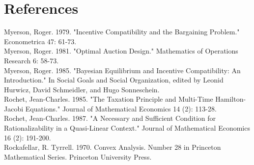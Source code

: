 \documentclass[10pt]{article}
\begin{document}
\section*{References}
Myerson, Roger. 1979. "Incentive Compatibility and the Bargaining Problem." Econometrica 47: 61-73.\\
Myerson, Roger. 1981. "Optimal Auction Design." Mathematics of Operations Research 6: 58-73.\\
Myerson, Roger. 1985. "Bayesian Equilibrium and Incentive Compatibility: An Introduction." In Social Goals and Social Organization, edited by Leonid Hurwicz, David Schmeidler, and Hugo Sonneschein.\\
Rochet, Jean-Charles. 1985. "The Taxation Principle and Multi-Time Hamilton-Jacobi Equations." Journal of Mathematical Economics 14 (2): 113-28.\\
Rochet, Jean-Charles. 1987. "A Necessary and Sufficient Condition for Rationalizability in a Quasi-Linear Context." Journal of Mathematical Economics 16 (2): 191-200.\\
Rockafellar, R. Tyrrell. 1970. Convex Analysis. Number 28 in Princeton Mathematical Series. Princeton University Press.
\end{document}
